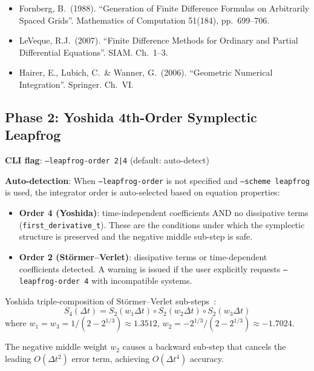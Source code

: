 \begin{itemize}
  \item Fornberg, B.\ (1988). ``Generation of Finite Difference Formulas on Arbitrarily
    Spaced Grids''. Mathematics of Computation 51(184), pp.\ 699--706.
  \item LeVeque, R.J.\ (2007). ``Finite Difference Methods for Ordinary and Partial
    Differential Equations''. SIAM. Ch.\ 1--3.
  \item Hairer, E., Lubich, C.\ \& Wanner, G.\ (2006). ``Geometric Numerical Integration''.
    Springer. Ch.\ VI.
\end{itemize}

\subsection{Phase 2: Yoshida 4th-Order Symplectic Leapfrog}
\label{sec:yoshida}

\textbf{CLI flag}: \texttt{--leapfrog-order 2|4} (default: auto-detect)

\textbf{Auto-detection}: When \texttt{--leapfrog-order} is not specified and \texttt{--scheme leapfrog}
is used, the integrator order is auto-selected based on equation properties:

\begin{itemize}
  \item \textbf{Order 4 (Yoshida)}: time-independent coefficients AND no dissipative terms
    (\texttt{first\_derivative\_t}). These are the conditions under which the symplectic
    structure is preserved and the negative middle sub-step is safe.
  \item \textbf{Order 2 (St\"ormer--Verlet)}: dissipative terms or time-dependent coefficients
    detected. A warning is issued if the user explicitly requests \texttt{--leapfrog-order 4}
    with incompatible systems.
\end{itemize}

Yoshida triple-composition of St\"ormer--Verlet sub-steps~\cite{yoshida1990symplectic}:
\begin{equation}
  S_4(\Delta t) = S_2(w_1 \Delta t) \circ S_2(w_2 \Delta t) \circ S_2(w_3 \Delta t)
  \label{eq:yoshida-composition}
\end{equation}
where $w_1 = w_3 = 1/(2 - 2^{1/3}) \approx 1.3512$, $w_2 = -2^{1/3}/(2 - 2^{1/3}) \approx -1.7024$.

The negative middle weight $w_2$ causes a backward sub-step that cancels the
leading $O(\Delta t^2)$ error term, achieving $O(\Delta t^4)$ accuracy.

